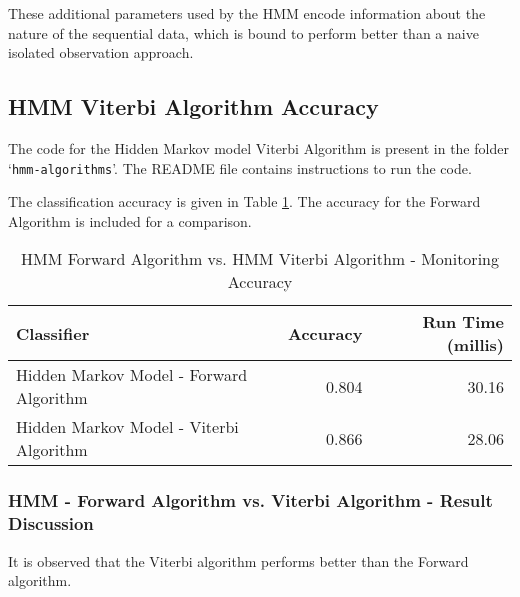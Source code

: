 \documentclass[parskip=half]{scrartcl}
\begin{document}
            These additional parameters used by the HMM encode information about the nature of the sequential data, which is bound to perform better than a naive isolated observation approach.
        



    \subsection{HMM Viterbi Algorithm Accuracy} %
    \label{sub:hmm_viterbi_algorithm_accuracy}

        The code for the Hidden Markov model Viterbi Algorithm is present in the folder `\texttt{hmm-algorithms}'. The README file contains instructions to run the code.

        The classification accuracy is given in Table \ref{tab:hmm-forward-vs-hmm-viterbi-accuracy}. The accuracy for the Forward Algorithm is included for a comparison.

        \begin{table}[ht]
            \centering
            \begin{tabular}{| l | r | r |}
            \hline
            \textbf{Classifier} & \textbf{Accuracy} & \textbf{Run Time (millis)} \\
            \hline
            \hline
                Hidden Markov Model - Forward Algorithm & 0.804 & 30.16\\
            \hline
                Hidden Markov Model - Viterbi Algorithm & 0.866 & 28.06 \\
            \hline
            \end{tabular}
            \caption{HMM Forward Algorithm vs. HMM Viterbi Algorithm - Monitoring Accuracy}
            \label{tab:hmm-forward-vs-hmm-viterbi-accuracy}
        \end{table}

        \subsubsection*{HMM - Forward Algorithm vs. Viterbi Algorithm - Result Discussion} %
        \label{ssub:hmm_forward_algo_vs_viterbi_algo_discuss}

            It is observed that the Viterbi algorithm performs better than the Forward algorithm.
\end{document}
